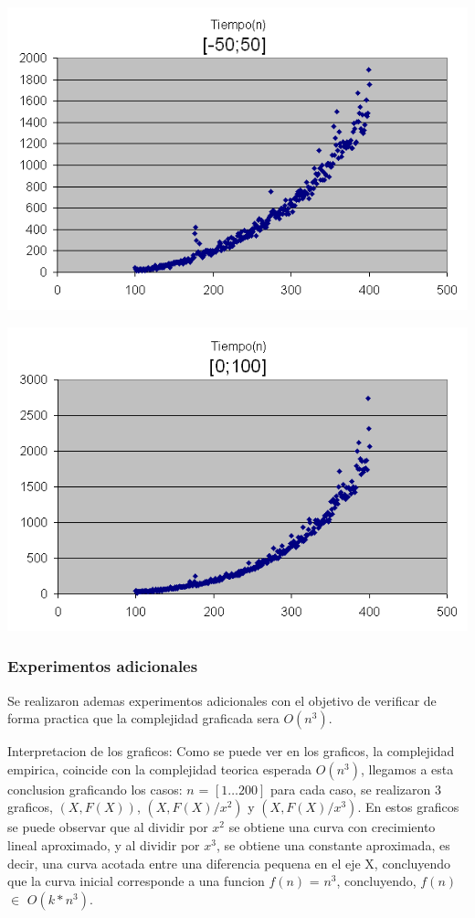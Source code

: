\begin{center}
	\includegraphics[scale=0.6]{images/ej1_2.png}
\end{center}

\begin{center}
	\includegraphics[scale=0.6]{images/ej1_3.png}
\end{center}


\subsubsection{Experimentos adicionales}
Se realizaron ademas experimentos adicionales con el objetivo de verificar de forma practica que la complejidad graficada sera $O(n^3)$.

\vspace{2mm}

Interpretacion de los graficos: Como se puede ver en los graficos, la complejidad empirica, coincide con la complejidad teorica esperada $O(n^3)$, llegamos a esta conclusion graficando los casos: $n$ = $[1\dots200]$ para cada caso, se realizaron 3 graficos, $(X,F(X))$,  $(X,F(X)/x^2)$ y $(X,F(X)/x^3)$. En estos graficos se puede observar que al dividir por $x^2$ se obtiene una curva con crecimiento lineal aproximado, y al dividir por $x^3$, se obtiene una constante aproximada, es decir, una curva acotada entre una diferencia pequena en el eje X, concluyendo que la curva inicial corresponde a una funcion $f(n)$ = $n^3$, concluyendo, $f(n)$ $\in$ $O(k*n^3)$.

